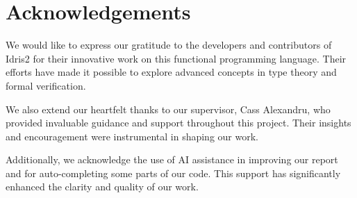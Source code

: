 \documentclass[]{rptuseminar}
\begin{document}
\newpage
\section*{Acknowledgements}
We would like to express our gratitude to the developers and contributors of Idris2 for their innovative work on this functional programming language. Their efforts have made it possible to explore advanced concepts in type theory and formal verification.

We also extend our heartfelt thanks to our supervisor, Cass Alexandru, who provided invaluable guidance and support throughout this project. Their insights and encouragement were instrumental in shaping our work.

Additionally, we acknowledge the use of AI assistance in improving our report and for auto-completing some parts of our code. This support has significantly enhanced the clarity and quality of our work.

\newpage
\nocite{*}



\end{document}
